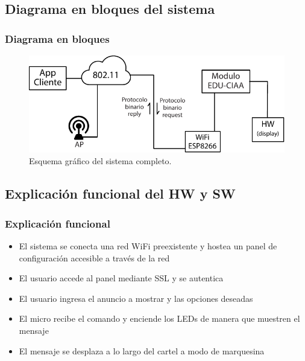 \subsection{Diagrama en bloques del sistema}
\begin{frame}
	\frametitle{Diagrama en bloques}
	\begin{figure}[htbp]
		\begin{center}
			\includegraphics[width=\textwidth]{diagramas/diagrama-bloques.pdf}
			\caption{Esquema gráfico del sistema completo.}
			\label{fig:diagrama-bloques}
		\end{center}
	\end{figure}
\end{frame}

\subsection{Explicación funcional del HW y SW}
\begin{frame}
	\frametitle{Explicación funcional}
	\begin{itemize}
		 \item El sistema se conecta una red WiFi preexistente y hostea un panel de configuración accesible a través de la red
		 \item El usuario accede al  panel mediante SSL y se autentica
		 \item El usuario ingresa el anuncio a mostrar y las opciones deseadas
		 \item El micro recibe el comando y enciende los LEDs de manera que muestren el mensaje
		 \item El mensaje se desplaza a lo largo del cartel a modo de marquesina
	\end{itemize}
	

\end{frame}

